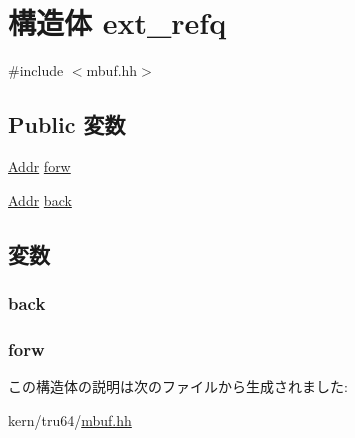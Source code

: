\hypertarget{structtru64_1_1m__ext_1_1ext__refq}{
\section{構造体 ext\_\-refq}
\label{structtru64_1_1m__ext_1_1ext__refq}
}


{\ttfamily \#include $<$mbuf.hh$>$}\subsection*{Public 変数}
\begin{DoxyCompactItemize}
\item 
\hyperlink{base_2types_8hh_af1bb03d6a4ee096394a6749f0a169232}{Addr} \hyperlink{structtru64_1_1m__ext_1_1ext__refq_a5485c8f13896db718e6af82b9c06ae27}{forw}
\item 
\hyperlink{base_2types_8hh_af1bb03d6a4ee096394a6749f0a169232}{Addr} \hyperlink{structtru64_1_1m__ext_1_1ext__refq_a8aa3a001ffb16adadc7a3eeb7ea66e18}{back}
\end{DoxyCompactItemize}


\subsection{変数}
\hypertarget{structtru64_1_1m__ext_1_1ext__refq_a8aa3a001ffb16adadc7a3eeb7ea66e18}{
\subsubsection[{back}]{ {\bf back}}}
\label{structtru64_1_1m__ext_1_1ext__refq_a8aa3a001ffb16adadc7a3eeb7ea66e18}
\hypertarget{structtru64_1_1m__ext_1_1ext__refq_a5485c8f13896db718e6af82b9c06ae27}{
\subsubsection[{forw}]{ {\bf forw}}}
\label{structtru64_1_1m__ext_1_1ext__refq_a5485c8f13896db718e6af82b9c06ae27}


この構造体の説明は次のファイルから生成されました:\begin{DoxyCompactItemize}
\item 
kern/tru64/\hyperlink{mbuf_8hh}{mbuf.hh}\end{DoxyCompactItemize}
